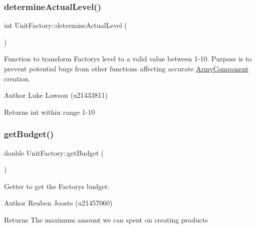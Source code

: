 \mbox{\label{class_unit_factory_a92120c06793ae808668a811e85efe2cb}} 
\subsubsection{\texorpdfstring{determineActualLevel()}{determineActualLevel()}}
{\footnotesize\ttfamily int Unit\+Factory\+::determine\+Actual\+Level (\begin{DoxyParamCaption}{ }\end{DoxyParamCaption})\hspace{0.3cm}{\ttfamily [protected]}}



Function to transform Factory\textquotesingle{}s level to a valid value between 1-\/10. Purpose is to prevent potential bugs from other functions affecting accurate \mbox{\hyperlink{class_army_component}{Army\+Component}} creation. 

\begin{DoxyAuthor}{Author}
Luke Lawson (u21433811) 
\end{DoxyAuthor}
\begin{DoxyReturn}{Returns}
int within range 1-\/10 
\end{DoxyReturn}
\mbox{\label{class_unit_factory_a1e58c093e5e132344cbcba117e6b03b3}} 
\subsubsection{\texorpdfstring{getBudget()}{getBudget()}}
{\footnotesize\ttfamily double Unit\+Factory\+::get\+Budget (\begin{DoxyParamCaption}{ }\end{DoxyParamCaption})}



Getter to get the Factory\textquotesingle{}s budget. 

\begin{DoxyAuthor}{Author}
Reuben Jooste (u21457060) 
\end{DoxyAuthor}
\begin{DoxyReturn}{Returns}
The maximum amount we can spent on creating products 
\end{DoxyReturn}
\mbox{\label{class_unit_factory_a1b125d48cad0a2da1a98089d7eed1d50}} 
